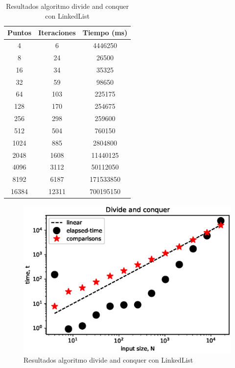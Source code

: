 \FloatBarrier
\begin{table}[h!]
    \centering
    \begin{tabular}{|c|c|c|}
    \hline
    Puntos & Iteraciones & Tiempo (ms)\\
    \hline
    4 & 6 & 4446250\\
    \hline
    8 & 24 & 26500\\
    \hline
    16 & 34 & 35325\\
    \hline
    32 & 59 & 98650\\
    \hline
    64 & 103 & 225175\\
    \hline
    128 & 170 & 254675\\
    \hline
    256 & 298 & 259600\\
    \hline
    512 & 504 & 760150\\
    \hline
    1024 & 885 & 2804800\\
    \hline
    2048 & 1608 & 11440125\\
    \hline
    4096 & 3112 & 50112050\\
    \hline
    8192 & 6187 & 171533850\\
    \hline
    16384 & 12311 & 700195150\\
    \hline
    \end{tabular}
    \caption{Resultados algoritmo divide and conquer con LinkedList}
    \label{tab:divideLT}
\end{table}
\begin{figure}[h!]
    \centering
    \includegraphics[scale=0.8, center]{images/divideLinkedList.eps}
    \caption{Resultados algoritmo divide and conquer con LinkedList}
    \label{fig:divideLG}
\end{figure}
\FloatBarrier